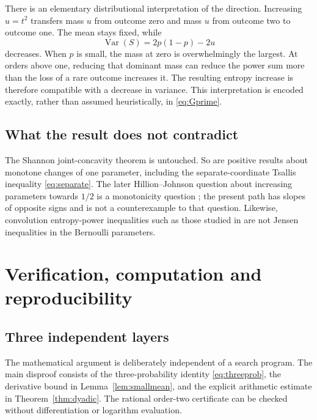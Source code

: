\documentclass[11pt]{article}
\numberwithin{equation}{section}
\theoremstyle{definition}
\theoremstyle{remark}
\newcommand{\Var}{\operatorname{Var}}
\begin{document}
There is an elementary distributional interpretation of the direction.
Increasing $u=t^2$ transfers mass $u$ from outcome zero and mass $u$ from
outcome two to outcome one. The mean stays fixed, while
\begin{equation}
 \Var(S)=2p(1-p)-2u
\end{equation}
decreases. When $p$ is small, the mass at zero is overwhelmingly the largest.
At orders above one, reducing that dominant mass can reduce the power sum
more than the loss of a rare outcome increases it. The resulting entropy
increase is therefore compatible with a decrease in variance. This
interpretation is encoded exactly, rather than assumed heuristically, in
\eqref{eq:Gprime}.

\subsection{What the result does not contradict}
The Shannon joint-concavity theorem is untouched. So are positive results
about monotone changes of one parameter, including the separate-coordinate
Tsallis inequality \eqref{eq:separate}. The later Hillion--Johnson question
about increasing parameters towards $1/2$ is a monotonicity question
\cite[Section~4]{HJ2019}; the present path has slopes of opposite signs and
is not a counterexample to that question. Likewise, convolution
entropy-power inequalities such as those studied in \cite{MMR2023} are not
Jensen inequalities in the Bernoulli parameters.

\section{Verification, computation and reproducibility}\label{bep:sec:verification}
\subsection{Three independent layers}
The mathematical argument is deliberately independent of a search program.
The main disproof consists of the three-probability identity
\eqref{eq:threeprob}, the derivative bound in
Lemma~\ref{lem:smallmean}, and the explicit arithmetic estimate in
Theorem~\ref{thm:dyadic}. The rational order-two certificate can be checked
without differentiation or logarithm evaluation.
\end{document}
